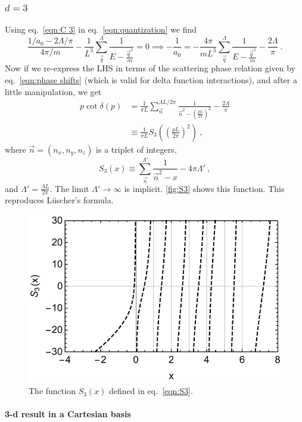 \documentclass[11pt]{article}
\begin{document}
\subsubsection{$d=3$}
Using eq.~\eqref{eqn:C 3} in eq.~\eqref{eqn:quantization} we find
\begin{equation}
\frac{1/a_0-2\Lambda/\pi}{4\pi/m}-\frac{1}{L^3}\sum_{\vec{q}}^\Lambda \frac { 1 } { E - \frac{\vec{q}^2}{m} }=0
\implies-\frac{1}{a_0}=-\frac{4\pi}{mL^3}\sum_{\vec{q}}^\Lambda \frac { 1 } { E - \frac{\vec{q}^2}{m} }-\frac{2\Lambda}{\pi}\ .
\end{equation}
Now if we re-express the LHS in terms of the scattering phase relation given by eq.~\eqref{eqn:phase shifts} (which is valid for delta function interactions), and after a little manipulation, we get
\begin{align}
p\cot \delta(p)&=\frac{1}{\pi L}\sum_{\vec{n}}^{\Lambda L/2\pi} \frac { 1 } { \vec{n}^2 -\left(\frac{pL}{2\pi}\right)^2}-\frac{2\Lambda}{\pi}\\
&\equiv \frac{1}{\pi L}S_3\left(\left(\frac{pL}{2\pi}\right)^2\right)\ ,
\end{align}
where $\vec{n}=(n_x,n_y,n_z)$ is a triplet of integers, 
\begin{equation}\label{eqn:S3}
S_3(x)\equiv\sum_{\vec{n}}^{\Lambda'} \frac { 1 } { \vec{n}^2 -x}-4\pi\Lambda'\ ,
\end{equation}
and $\Lambda'=\frac{\Lambda L}{2\pi}$.  The limit $\Lambda'\to\infty$ is implicit.  \autoref{fig:S3} shows this function. This reproduces L\"uscher's formula. 
\begin{figure}
\center
\includegraphics[width=.8\columnwidth]{figure/S3.pdf}
\caption{The function $S_3(x)$ defined in eq.~\eqref{eqn:S3}.\label{fig:S3}}
\end{figure}

\paragraph{3-d result in a Cartesian basis\\}
\end{document}
